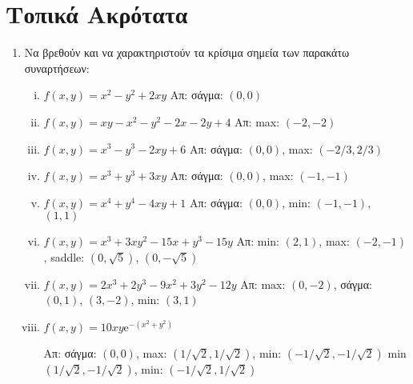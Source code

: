


\pagestyle{askhseis}

\renewcommand{\vec}{\mathbf}



\begin{center}
  \minibox{\large \bfseries \textcolor{Col1}{Ασκήσεις στα Ακρότατα}}
\end{center}

\vspace{\baselineskip}

\section*{Τοπικά Ακρότατα}

\begin{enumerate}
  \item Να βρεθούν και να χαρακτηριστούν τα κρίσιμα σημεία  των παρακάτω συναρτήσεων:
    \begin{enumerate}[i)]
      \item $ f(x,y) = x^{2}-y^{2}+2xy $
        \hfill Απ:  σάγμα: $(0,0) $ 
      \item $ f(x,y) = xy-x^{2}-y^2-2x-2y+4 $
        \hfill Απ: max: $(-2,-2)  $
      \item $ f(x,y) = x^{3}-y^{3}-2xy+6 $
        \hfill Απ: σάγμα: $ (0,0) $, max: $ (-2/3, 2/3) $  
      \item $ f(x,y) = x^{3}+y^{3}+3xy $ 
        \hfill Απ: σάγμα: $ (0,0) $, max: $ (-1,-1) $ 
      \item $ f(x,y) = x^{4}+y^{4}-4xy+1 $
        \hfill Απ:  σάγμα: $(0,0) $,  min: $(-1,-1) $, $(1,1)  $ 
      \item $ f(x,y) = x^{3}+3xy^{2}-15x+y^{3}-15y $
        \hfill Απ: min: $ (2,1) $, max: $ (-2,-1) $, saddle: $ (0, \sqrt{5}) $, $ (0,-
        \sqrt{5}) $
      \item $ f(x,y) = 2x^{3}+2y^{3}-9x^{2}+3y^{2}-12y $
        \hfill Απ: max: $ (0,-2) $, σάγμα: $ (0,1) $, $ (3,-2) $, min: $ (3,1) $ 
      \item $ f(x,y) = 10xy \mathrm{e}^{-(x^{2}+y^2)} $


        \hfill Απ: σάγμα: $(0,0) $, 
        max: $(1/ \sqrt{2} , 1/ \sqrt{2}) $, min: $ (-1/ \sqrt{2}, -1/ \sqrt{2}) $  
        min $(1/ \sqrt{2} , -1/ \sqrt{2}) $, min: $ (-1/ \sqrt{2}, 1/ \sqrt{2}) $  
    \end{enumerate}


\end{enumerate}
